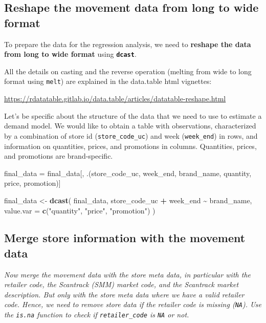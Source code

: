 \documentclass[
]{article}
\newenvironment{Shaded}{\begin{snugshade}}{\end{snugshade}}
\newcommand{\AttributeTok}[1]{\textcolor[rgb]{0.13,0.29,0.53}{#1}}
\newcommand{\FunctionTok}[1]{\textcolor[rgb]{0.13,0.29,0.53}{\textbf{#1}}}
\newcommand{\NormalTok}[1]{#1}
\newcommand{\OtherTok}[1]{\textcolor[rgb]{0.56,0.35,0.01}{#1}}
\newcommand{\SpecialCharTok}[1]{\textcolor[rgb]{0.81,0.36,0.00}{\textbf{#1}}}
\newcommand{\StringTok}[1]{\textcolor[rgb]{0.31,0.60,0.02}{#1}}
\begin{document}
\subsection{Reshape the movement data from long to wide
format}\label{reshape-the-movement-data-from-long-to-wide-format}

To prepare the data for the regression analysis, we need to
\textbf{reshape the data from long to wide format} using
\textbf{\texttt{dcast}}.

All the details on casting and the reverse operation (melting from wide
to long format using \texttt{melt}) are explained in the data.table html
vignettes:

\url{https://rdatatable.gitlab.io/data.table/articles/datatable-reshape.html}

Let's be specific about the structure of the data that we need to use to
estimate a demand model. We would like to obtain a table with
observations, characterized by a combination of store id
(\texttt{store\_code\_uc}) and week (\texttt{week\_end}) in rows, and
information on quantities, prices, and promotions in columns.
Quantities, prices, and promotions are brand-specific.

\begin{Shaded}
\begin{Highlighting}[]
\NormalTok{final\_data }\OtherTok{=}\NormalTok{ final\_data[, .(store\_code\_uc, week\_end, brand\_name, quantity, price, promotion)]}

\NormalTok{final\_data }\OtherTok{\textless{}{-}} \FunctionTok{dcast}\NormalTok{(}
\NormalTok{  final\_data, }
\NormalTok{  store\_code\_uc }\SpecialCharTok{+}\NormalTok{ week\_end }\SpecialCharTok{\textasciitilde{}}\NormalTok{ brand\_name, }
  \AttributeTok{value.var =} \FunctionTok{c}\NormalTok{(}\StringTok{"quantity"}\NormalTok{, }\StringTok{"price"}\NormalTok{, }\StringTok{"promotion"}\NormalTok{)}
\NormalTok{)}
\end{Highlighting}
\end{Shaded}

\subsection{Merge store information with the movement
data}\label{merge-store-information-with-the-movement-data}

\emph{Now merge the movement data with the store meta data, in
particular with the retailer code, the Scantrack (SMM) market code, and
the Scantrack market description. But only with the store meta data
where we have a valid retailer code. Hence, we need to remove store data
if the retailer code is missing (\texttt{NA}). Use the \texttt{is.na}
function to check if \texttt{retailer\_code} is \texttt{NA} or not.}
\end{document}
